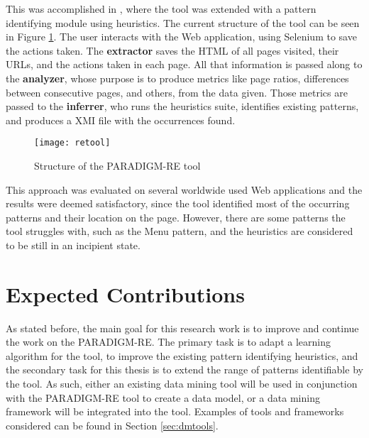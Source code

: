 This was accomplished in \cite{nabuco2014inferring}, where the tool was extended with a pattern identifying module using heuristics. The current structure of the tool can be seen in Figure \ref{fig:retool}. The user interacts with the Web application, using Selenium to save the actions taken. The \textbf{extractor} saves the HTML of all pages visited, their URLs, and the actions taken in each page. All that information is passed along to the \textbf{analyzer}, whose purpose is to produce metrics like page ratios, differences between consecutive pages, and others, from the data given. Those metrics are passed to the \textbf{inferrer}, who runs the heuristics suite, identifies existing patterns, and produces a XMI file with the occurrences found.

\begin{figure}[htb]
  \begin{center}
    \leavevmode
    \texttt{[image: retool]}
  	\caption[Structure of the PARADIGM-RE tool]{Structure of the PARADIGM-RE tool \cite{nabuco2014inferring}}
  	\label{fig:retool}
   \end{center}
\end{figure}

This approach was evaluated on several worldwide used Web applications and the results were deemed satisfactory, since the tool identified most of the occurring patterns and their location on the page. However, there are some patterns the tool struggles with, such as the Menu pattern, and the heuristics are considered to be still in an incipient state.

\section{Expected Contributions} \label{sec:project}

As stated before, the main goal for this research work is to improve and continue the work on the PARADIGM-RE. The primary task is to adapt a learning algorithm for the tool, to improve the existing pattern identifying heuristics, and the secondary task for this thesis is to extend the range of patterns identifiable by the tool. As such, either an existing data mining tool will be used in conjunction with the PARADIGM-RE tool to create a data model, or a data mining framework will be integrated into the tool. Examples of tools and frameworks considered can be found in Section \ref{sec:dmtools}. 

